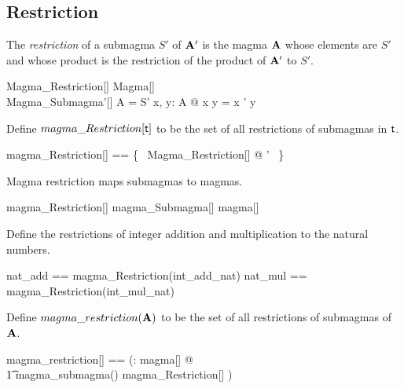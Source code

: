 \documentclass{amsart}
\begin{document}
\subsection{Restriction}

The \textit{restriction} of a submagma $S'$ of $\mathbf{A}'$ is the magma $\mathbf{A}$ 
whose elements are $S'$ and whose product is the restriction of the product of $\mathbf{A}'$ to $S'$.

\begin{schema}{Magma\_Restriction}[\genT]
	Magma[\genT] \\
	Magma\_Submagma'[\genT]
\where
	A = S'
\also
	\forall x, y: A @ x \opG y = x \opG' y
\end{schema}

Define $magma\_Restriction[\mathsf{t}]$ to be the set of all restrictions of submagmas in $\mathsf{t}$.

\begin{zed}
	magma\_Restriction[\genT] == \{~ Magma\_Restriction[\genT] @ \strucS' \mapsto \strucA ~\}
\end{zed}

\begin{remark}
Magma restriction maps submagmas to magmas.

\begin{zed}

magma\_Restriction[\setT] \in magma\_Submagma[\setT] \fun magma[\setT]

\end{zed}

\begin{example}
Define the restrictions of integer addition and multiplication to the natural numbers.

\begin{zed}
	nat\_add == magma\_Restriction(int\_add\_nat)
\also
	nat\_mul == magma\_Restriction(int\_mul\_nat)
\end{zed}

\end{example}

\end{remark}

Define $magma\_restriction(\mathbf{A})$ to be the set of all restrictions of submagmas of $\mathbf{A}$.

\begin{zed}
	magma\_restriction[\genT] == (\lambda \strucA: magma[\genT] @ \\
	\t1	magma\_submagma(\strucA) \dres magma\_Restriction[\genT] )
\end{zed}
\end{document}
